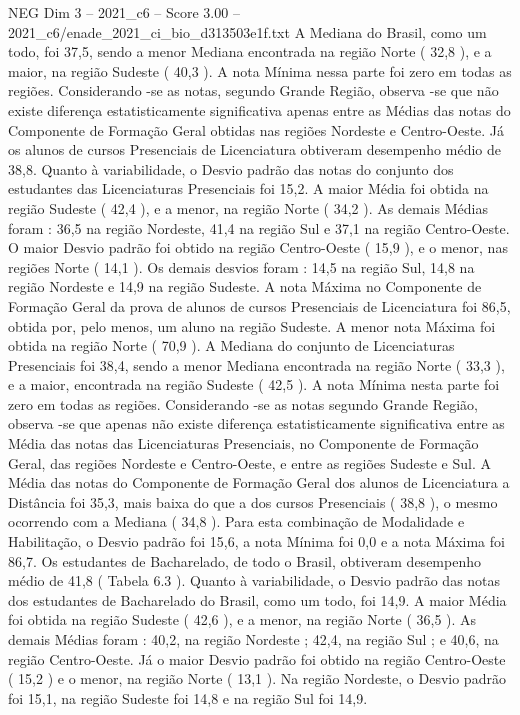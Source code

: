 \begin{textsample}{NEG Dim 3 – 2021\_c6 – Score 3.00 – 2021\_c6/enade\_2021\_ci\_bio\_d313503e1f.txt}
A Mediana do Brasil, como um todo, foi 37,5, sendo a menor Mediana encontrada na região Norte ( 32,8 ), e a maior, na região Sudeste ( 40,3 ).
A nota Mínima nessa parte foi zero em todas as regiões.
Considerando -se as notas, segundo Grande Região, observa -se que não existe diferença estatisticamente significativa apenas entre as Médias das notas do Componente de Formação Geral obtidas nas regiões Nordeste e Centro-Oeste.
Já os alunos de cursos Presenciais de Licenciatura obtiveram desempenho médio de 38,8.
Quanto à variabilidade, o Desvio padrão das notas do conjunto dos estudantes das Licenciaturas Presenciais foi 15,2.
A maior Média foi obtida na região Sudeste ( 42,4 ), e a menor, na região Norte ( 34,2 ).
As demais Médias foram : 36,5 na região Nordeste, 41,4 na região Sul e 37,1 na região Centro-Oeste.
O maior Desvio padrão foi obtido na região Centro-Oeste ( 15,9 ), e o menor, nas regiões Norte ( 14,1 ).
Os demais desvios foram : 14,5 na região Sul, 14,8 na região Nordeste e 14,9 na região Sudeste.
A nota Máxima no Componente de Formação Geral da prova de alunos de cursos Presenciais de Licenciatura foi 86,5, obtida por, pelo menos, um aluno na região Sudeste.
A menor nota Máxima foi obtida na região Norte ( 70,9 ).
A Mediana do conjunto de Licenciaturas Presenciais foi 38,4, sendo a menor Mediana encontrada na região Norte ( 33,3 ), e a maior, encontrada na região Sudeste ( 42,5 ).
A nota Mínima nesta parte foi zero em todas as regiões.
Considerando -se as notas segundo Grande Região, observa -se que apenas não existe diferença estatisticamente significativa entre as Média das notas das Licenciaturas Presenciais, no Componente de Formação Geral, das regiões Nordeste e Centro-Oeste, e entre as regiões Sudeste e Sul.
A Média das notas do Componente de Formação Geral dos alunos de Licenciatura a Distância foi 35,3, mais baixa do que a dos cursos Presenciais ( 38,8 ), o mesmo ocorrendo com a Mediana ( 34,8 ).
Para esta combinação de Modalidade e Habilitação, o Desvio padrão foi 15,6, a nota Mínima foi 0,0 e a nota Máxima foi 86,7.
Os estudantes de Bacharelado, de todo o Brasil, obtiveram desempenho médio de 41,8 ( Tabela 6.3 ).
Quanto à variabilidade, o Desvio padrão das notas dos estudantes de Bacharelado do Brasil, como um todo, foi 14,9.
A maior Média foi obtida na região Sudeste ( 42,6 ), e a menor, na região Norte ( 36,5 ).
As demais Médias foram : 40,2, na região Nordeste ; 42,4, na região Sul ; e 40,6, na região Centro-Oeste.
Já o maior Desvio padrão foi obtido na região Centro-Oeste ( 15,2 ) e o menor, na região Norte ( 13,1 ).
Na região Nordeste, o Desvio padrão foi 15,1, na região Sudeste foi 14,8 e na região Sul foi 14,9.

\end{textsample}
